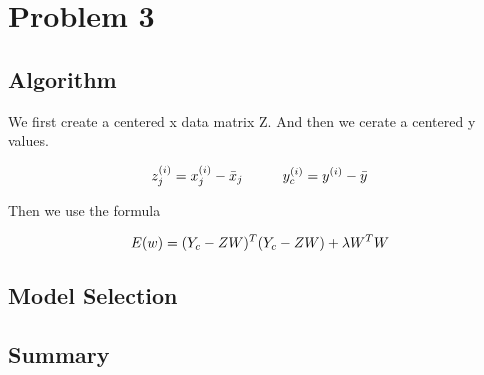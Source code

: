 \section{Problem 3}

\subsection{Algorithm}

We first create a centered x data matrix Z. And then we cerate a centered y values.

\begin{equation}
z^{(i)}_{j} = x^{(i)}_{j} - \bar{x}_{j} \hspace{10 mm} 
y^{(i)}_{c} = y^{(i)} - \bar{y} \\
\end{equation}

Then we use the formula

\begin{equation}
  E(w)= (Y_{c} - ZW)^T(Y_{c}-ZW) + \lambda W^TW \\
\end{equation}


\subsection{Model Selection}

\subsection{Summary}
